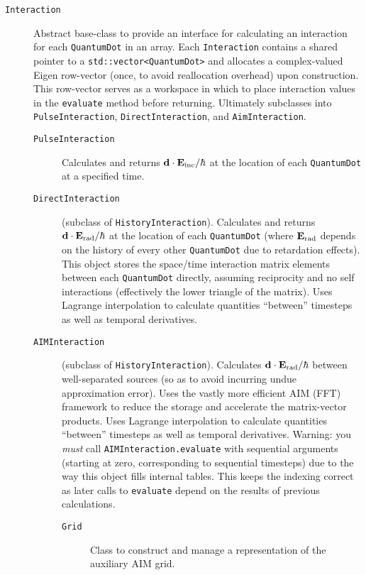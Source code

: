 \begin{description}
  \item[\texttt{Interaction}] Abstract base-class to provide an interface for calculating an interaction for each \lstinline!QuantumDot! in an array.
    Each \lstinline!Interaction! contains a shared pointer to a \lstinline!std::vector<QuantumDot>! and allocates a complex-valued Eigen row-vector (once, to avoid reallocation overhead) upon construction.
    This row-vector serves as a workspace in which to place interaction values in the \lstinline!evaluate! method before returning.
    Ultimately subclasses into \lstinline!PulseInteraction!, \lstinline!DirectInteraction!, and \lstinline!AimInteraction!.
    \begin{description}
      \item[\texttt{PulseInteraction}] Calculates and returns $\vb{d} \cdot \vb{E}_\text{inc}/\hbar$ at the location of each \lstinline!QuantumDot! at a specified time.
      \item[\texttt{DirectInteraction}] (subclass of \lstinline!HistoryInteraction!).
        Calculates and returns $\vb{d} \cdot \vb{E}_\text{rad}/\hbar$ at the location of each \lstinline!QuantumDot! (where $\vb{E}_\text{rad}$ depends on the history of every other \lstinline!QuantumDot! due to retardation effects).
        This object stores the space/time interaction matrix elements between each \lstinline!QuantumDot! directly, assuming reciprocity and no self interactions (effectively the lower triangle of the matrix).
        Uses Lagrange interpolation to calculate quantities ``between'' timesteps as well as temporal derivatives.
      \item[\texttt{AIMInteraction}] (subclass of \lstinline!HistoryInteraction!).
        Calculates $\vb{d} \cdot \vb{E}_\text{rad}/\hbar$ between well-separated sources (so as to avoid incurring undue approximation error).
        Uses the vastly more efficient AIM (FFT) framework to reduce the storage and accelerate the matrix-vector products.
        Uses Lagrange interpolation to calculate quantities ``between'' timesteps as well as temporal derivatives.
        \textcolor{Red!90!black}{Warning:} you \emph{must} call \lstinline!AIMInteraction.evaluate! with sequential arguments (starting at zero, corresponding to sequential timesteps) due to the way this object fills internal tables.
        This keeps the indexing correct as later calls to \lstinline!evaluate! depend on the results of previous calculations.
        \begin{description}
          \item[\texttt{Grid}] Class to construct and manage a representation of the auxiliary AIM grid.

\end{description}
\end{description}
\end{description}
